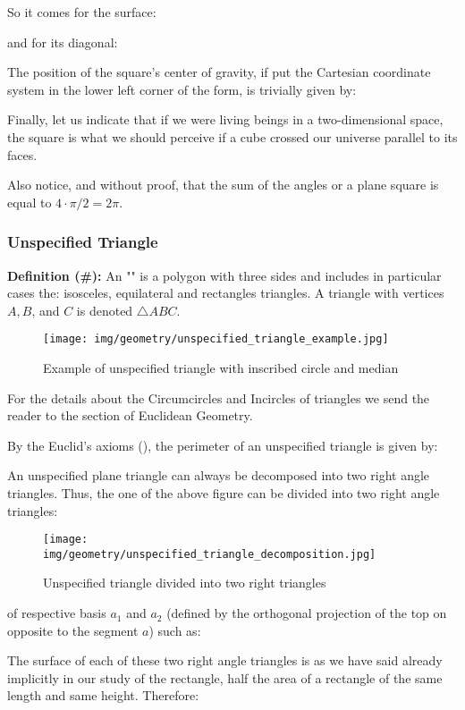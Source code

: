 {	So it comes for the surface:
	
	and for its diagonal:
	
	The position of the square's center of gravity, if put the Cartesian coordinate system in the lower left corner of the form, is trivially given by:
	
	Finally, let us indicate that if we were living beings in a two-dimensional space, the square is what we should perceive if a cube crossed our universe parallel to its faces.
	
	Also notice, and without proof, that the sum of the angles or a plane square is equal to $4\cdot \pi/2=2\pi$.
	
	\pagebreak
	\subsubsection{Unspecified Triangle}
	\textbf{Definition (\#\mydef):} An "\label{unspecified triangle}" is a polygon with three sides and includes in particular cases the: isosceles, equilateral and rectangles triangles.  A triangle with vertices $A, B$, and $C$ is denoted $\triangle ABC$.
	\begin{figure}[H]
		\centering
		\texttt{[image: img/geometry/unspecified\_triangle\_example.jpg]}
		\caption{Example of unspecified triangle with inscribed circle and median}
	\end{figure}
	\begin{tcolorbox}[title=Remark,colframe=black,arc=10pt]
	For the details about the Circumcircles and Incircles of triangles we send the reader to the section of Euclidean Geometry.
	\end{tcolorbox}	
	By the Euclid's axioms (), the perimeter of an unspecified triangle is given by:
	
	An unspecified plane triangle can always be decomposed into two right angle triangles. Thus, the one of the above figure can be divided into two right angle triangles:
	\begin{figure}[H]
		\centering
		\texttt{[image: img/geometry/unspecified\_triangle\_decomposition.jpg]}
		\caption{Unspecified triangle divided into two right triangles}
	\end{figure}
	of respective basis $a_1$ and $a_2$ (defined by the orthogonal projection of the top on opposite to the segment $a$) such as:
	
	The surface of each of these two right angle triangles is as we have said already implicitly in our study of the rectangle, half the area of a rectangle of the same length and same height. Therefore:
	
}
